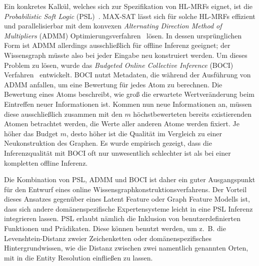 Ein konkretes Kalkül, welches sich zur Spezifikation von HL-MRFs eignet, ist die \textit{Probabilistic Soft Logic} (PSL)~\cite{Broecheler2010}\cite{Bach2015}.
MAX-SAT lässt sich für solche HL-MRFs effizient und parallelisierbar mit dem konvexen \textit{Alternating Direction Method of Multipliers} (ADMM) Optimierungsverfahren~\cite{Boyd2011} lösen.
In dessen ursprünglichen Form ist ADMM allerdings ausschließlich für offline Inferenz geeignet;
der Wissensgraph müsste also bei jeder Eingabe neu konstruiert werden.
Um dieses Problem zu lösen, wurde das \textit{Budgeted Online Collective Inference} (BOCI) Verfahren~\cite{Pujara2015} entwickelt.
BOCI nutzt Metadaten, die während der Ausführung von ADMM anfallen, um eine Bewertung für jedes Atom zu berechnen.
Die Bewertung eines Atoms beschreibt, wie groß die erwartete Wertveränderung beim Eintreffen neuer Informationen ist.
Kommen nun neue Informationen an, müssen diese ausschließlich zusammen mit den $m$ höchstbewerteten bereits existierenden Atomen betrachtet werden, die Werte aller anderen Atome werden fixiert.
Je höher das Budget $m$, desto höher ist die Qualität im Vergleich zu einer Neukonstruktion des Graphen.
Es wurde empirisch gezeigt, dass die Inferenzqualität mit BOCI oft nur unwesentlich schlechter ist als bei einer kompletten offline Inferenz.

Die Kombination von PSL, ADMM und BOCI ist daher ein guter Ausgangspunkt für den Entwurf eines online Wissensgraphkonstruktionsverfahrens.
Der Vorteil dieses Ansatzes gegenüber eines Latent Feature oder Graph Feature Modells ist, dass sich andere domänenspezifische Expertensysteme leicht in eine PSL Inferenz integrieren lassen.
PSL erlaubt nämlich die Inklusion von benutzerdefinierten Funktionen und Prädikaten.
Diese können benutzt werden, um z.~B. die Levenshtein-Distanz zweier Zeichenketten oder domänenspezifisches Hintergrundwissen, wie die Distanz zwischen zwei namentlich genannten Orten, mit in die Entity Resolution einfließen zu lassen.
